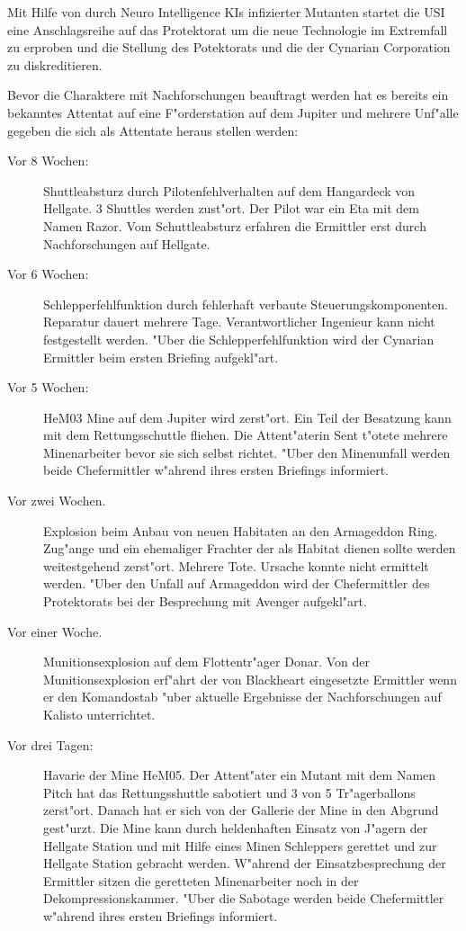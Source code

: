 Mit Hilfe von durch Neuro Intelligence KIs infizierter Mutanten startet die USI eine Anschlagsreihe auf das Protektorat um die neue Technologie im Extremfall zu erproben und die Stellung des Potektorats und die der Cynarian Corporation zu diskreditieren.

Bevor die Charaktere mit Nachforschungen beauftragt werden hat es bereits ein bekanntes Attentat auf eine F"orderstation auf dem Jupiter und mehrere Unf"alle gegeben die sich als Attentate heraus stellen werden:

\begin{description}
\item [Vor 8 Wochen:] Shuttleabsturz durch Pilotenfehlverhalten auf dem Hangardeck von Hellgate. 3 Shuttles
      werden zust"ort. Der Pilot war ein Eta mit dem Namen Razor. Vom Schuttleabsturz erfahren die Ermittler erst durch Nachforschungen auf Hellgate.
\item [Vor 6 Wochen:] Schlepperfehlfunktion durch fehlerhaft verbaute Steuerungskomponenten. Reparatur dauert
      mehrere Tage. Verantwortlicher Ingenieur kann nicht festgestellt werden. "Uber die Schlepperfehlfunktion wird der Cynarian Ermittler beim ersten Briefing aufgekl"art.
\item [Vor 5 Wochen:] HeM03 Mine auf dem Jupiter wird zerst"ort. Ein Teil der Besatzung kann mit dem
      Rettungsschuttle fliehen. Die Attent"aterin Sent t"otete mehrere Minenarbeiter bevor sie sich selbst richtet. "Uber den Minenunfall werden beide Chefermittler w"ahrend ihres ersten Briefings informiert.
\item [Vor zwei Wochen.] Explosion beim Anbau von neuen Habitaten an den Armageddon Ring. Zug"ange und ein
      ehemaliger Frachter der als Habitat dienen sollte werden weitestgehend zerst"ort.  Mehrere Tote. Ursache konnte nicht ermittelt werden. "Uber den Unfall auf Armageddon wird der Chefermittler des Protektorats bei der Besprechung mit Avenger aufgekl"art.
\item [Vor einer Woche.] Munitionsexplosion auf dem Flottentr"ager Donar. Von der Munitionsexplosion erf"ahrt der
      von Blackheart eingesetzte Ermittler wenn er den Komandostab "uber aktuelle Ergebnisse der Nachforschungen auf Kalisto unterrichtet.
\item [Vor drei Tagen:] Havarie der Mine HeM05. Der Attent"ater ein Mutant mit dem Namen Pitch hat das
      Rettungsshuttle sabotiert und 3 von 5 Tr"agerballons zerst"ort. Danach hat er sich von der Gallerie der Mine in den Abgrund gest"urzt. Die Mine kann durch heldenhaften Einsatz von J"agern der Hellgate Station und mit Hilfe eines Minen Schleppers gerettet und zur Hellgate Station gebracht werden. W"ahrend der Einsatzbesprechung der Ermittler sitzen die geretteten Minenarbeiter noch in der Dekompressionskammer. "Uber die Sabotage werden beide Chefermittler w"ahrend ihres ersten Briefings informiert.
\end{description}

